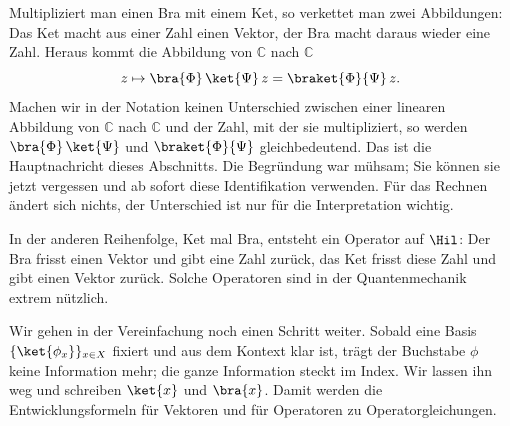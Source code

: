 Multipliziert man einen Bra mit einem Ket, so verkettet man zwei Abbildungen: Das Ket macht aus
einer Zahl einen Vektor, der Bra macht daraus wieder eine Zahl. Heraus kommt die Abbildung von
$\mathbb{C}$ nach $\mathbb{C}$
\begin{equation*}
  z \mapsto \bra{\Phi}\, \ket{\Psi}\, z = \braket{\Phi}{\Psi}\, z .
\end{equation*}
Machen wir in der Notation keinen Unterschied zwischen einer linearen Abbildung von
$\mathbb{C}$ nach $\mathbb{C}$ und der Zahl, mit der sie multipliziert, so werden
$\bra{\Phi}\, \ket{\Psi}$ und $\braket{\Phi}{\Psi}$ gleichbedeutend. Das ist die Hauptnachricht
dieses Abschnitts. Die Begründung war mühsam; Sie können sie jetzt vergessen und ab sofort diese
Identifikation verwenden. Für das Rechnen ändert sich nichts, der Unterschied ist nur für die
Interpretation wichtig.

In der anderen Reihenfolge, Ket mal Bra, entsteht ein Operator auf $\Hil$: Der Bra frisst einen
Vektor und gibt eine Zahl zurück, das Ket frisst diese Zahl und gibt einen Vektor zurück. Solche
Operatoren sind in der Quantenmechanik extrem nützlich.


Wir gehen in der Vereinfachung noch einen Schritt weiter. Sobald eine Basis
$\{\ket{\phi_x}\}_{x \in X}$ fixiert und aus dem Kontext klar ist, trägt der Buchstabe $\phi$
keine Information mehr; die ganze Information steckt im Index. Wir lassen ihn weg und schreiben
$\ket{x}$ und $\bra{x}$. Damit werden die Entwicklungsformeln für Vektoren und für Operatoren zu
Operatorgleichungen.

